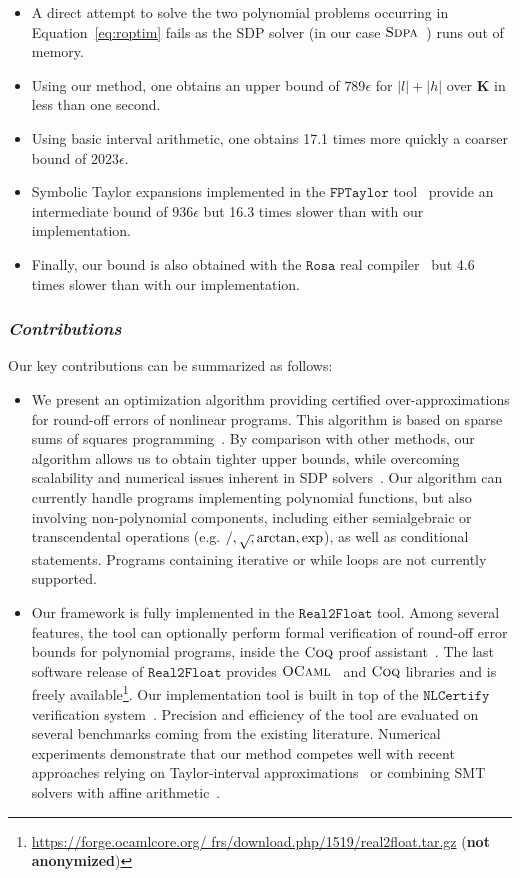\documentclass[preprint]{sigplanconf}
\def\E{\mathbf{E}}
\def\K{\mathbf{K}}
\def\X{\mathbf{X}}
\newcommand{\realtofloat}{\mathtt{Real2Float}}
\newcommand{\coq}{\text{\sc Coq}}
\newcommand{\ocaml}{\text{\sc OCaml}}
\newcommand{\rosa}{\mathtt{Rosa}}
\newcommand{\sdpa}{\text{\sc Sdpa}}
\newcommand{\fptaylor}{\mathtt{FPTaylor}}
\newcommand{\nlcertify}{\mathtt{NLCertify}}
\theoremstyle{plain}
\begin{document}
\begin{itemize}
\item A direct attempt to solve the two polynomial problems occurring in Equation~\eqref{eq:roptim} fails as the SDP solver (in our case $\sdpa$~\cite{sdpa7}) runs out of memory. 
\item Using our method, one obtains an upper bound of $789 \epsilon$ for $|l| + |h|$ over $\K$ in less than one second.
\item Using basic interval arithmetic, one obtains 17.1 times more quickly a coarser bound of $2023 \epsilon$. 
\item Symbolic Taylor expansions implemented in the $\fptaylor$ tool~\cite{fptaylor15} provide an intermediate bound of $936 \epsilon$ but 16.3 times slower than with our implementation. 
\item Finally, our bound is also obtained with the $\rosa$ real compiler~\cite{Darulova14Popl} but 4.6 times slower than with our implementation.
\end{itemize}
%
\subsubsection*{\textit{Contributions}} 
%
Our key contributions can be summarized as follows:
\begin{itemize}
\item We present an optimization algorithm providing certified over-approximations for round-off errors of nonlinear programs. This algorithm is based on sparse sums of squares programming~\cite{Las06SparseSOS}. By comparison with other methods, our algorithm allows us to obtain tighter upper bounds, while overcoming scalability and numerical issues inherent in SDP solvers~\cite{Todd01semidefiniteoptimization}. Our algorithm can currently handle  programs implementing polynomial functions, but also involving non-polynomial components, including either semialgebraic or transcendental operations (e.g. $/, \sqrtsign, \arctan, \exp$), as well as conditional statements.  Programs containing iterative or while loops are not currently supported.
\item Our framework is fully implemented in the $\realtofloat$ tool.  Among several features, the tool can optionally perform formal verification of round-off error bounds for polynomial programs, inside the $\coq$ proof assistant~\cite{CoqProofAssistant}. The last software release of $\realtofloat$ provides $\ocaml$~\cite{OCaml} and $\coq$ libraries and is freely available\footnote{\url{https://forge.ocamlcore.org/
frs/download.php/1519/real2float.tar.gz} (\textbf{not anonymized})}.
%
%
Our implementation tool is built in top of the $\nlcertify$ verification system~\cite{icms14}. Precision and efficiency of the tool are evaluated on several benchmarks coming from the existing literature. Numerical experiments demonstrate that our method competes well with recent approaches relying on Taylor-interval approximations~\cite{fptaylor15} or combining SMT solvers with affine arithmetic~\cite{Darulova14Popl}.
\end{itemize}
%
\end{document}
